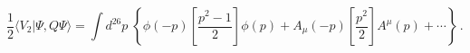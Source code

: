 \begin{equation}
\frac{1}{2}\langle V_2 | \Psi, Q \Psi \rangle =
\int d^{26} p \; \left\{
\phi (-p) \left[ \frac{p^2 -1}{2}  \right]\phi (p)
+ A_\mu (-p) \left[ \frac{p^2}{2}  \right]A^\mu (p) + \cdots
\right\}\,.
\end{equation}

